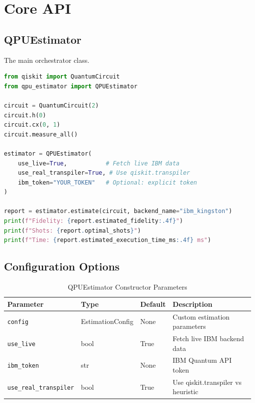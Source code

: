 \documentclass[11pt,a4paper]{article}
\begin{document}
\section{Core API}

\subsection{QPUEstimator}

The main orchestrator class.

\begin{lstlisting}[language=Python,caption=Basic Usage]
from qiskit import QuantumCircuit
from qpu_estimator import QPUEstimator

circuit = QuantumCircuit(2)
circuit.h(0)
circuit.cx(0, 1)
circuit.measure_all()

estimator = QPUEstimator(
    use_live=True,           # Fetch live IBM data
    use_real_transpiler=True, # Use qiskit.transpiler
    ibm_token="YOUR_TOKEN"   # Optional: explicit token
)

report = estimator.estimate(circuit, backend_name="ibm_kingston")
print(f"Fidelity: {report.estimated_fidelity:.4f}")
print(f"Shots: {report.optimal_shots}")
print(f"Time: {report.estimated_execution_time_ms:.4f} ms")
\end{lstlisting}

\subsection{Configuration Options}

\begin{table}[htbp]
\centering
\caption{QPUEstimator Constructor Parameters}
\begin{tabular}{@{}lllp{5cm}@{}}
\toprule
\textbf{Parameter} & \textbf{Type} & \textbf{Default} & \textbf{Description} \\
\midrule
\texttt{config} & EstimationConfig & None & Custom estimation parameters \\
\texttt{use\_live} & bool & True & Fetch live IBM backend data \\
\texttt{ibm\_token} & str & None & IBM Quantum API token \\
\texttt{use\_real\_transpiler} & bool & True & Use qiskit.transpiler vs heuristic \\
\bottomrule
\end{tabular}
\end{table}
\end{document}
